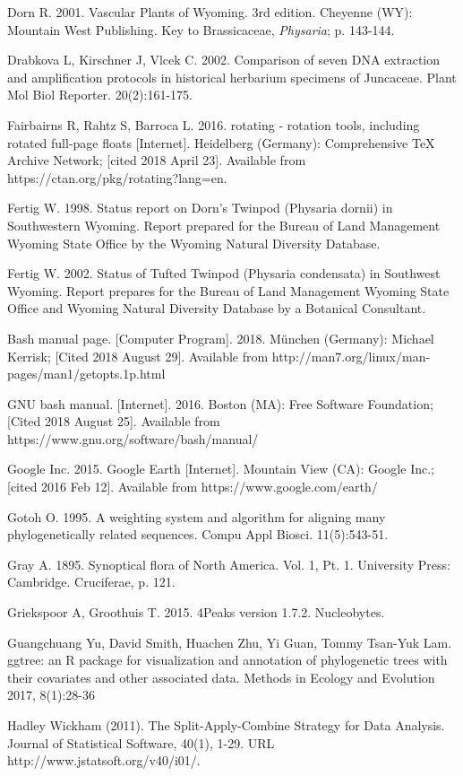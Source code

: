 Dorn R. 2001. Vascular Plants of Wyoming. 3rd edition. Cheyenne (WY): Mountain West Publishing. Key to Brassicaceae, \textit{Physaria}; p. 143-144.

Drabkova L, Kirschner J, Vlcek C. 2002. Comparison of seven DNA extraction and amplification protocols in historical herbarium specimens of Juncaceae. Plant Mol Biol Reporter. 20(2):161-175.

Fairbairns R, Rahtz S, Barroca L. 2016. rotating - rotation tools, including rotated full-page floats [Internet]. Heidelberg (Germany): Comprehensive TeX Archive Network; [cited 2018 April 23]. Available from https://ctan.org/pkg/rotating?lang=en.

Fertig W. 1998. Status report on Dorn’s Twinpod (Physaria dornii) in Southwestern Wyoming. Report prepared for the Bureau of Land Management Wyoming State Office by the Wyoming Natural Diversity Database.  

Fertig W. 2002. Status of Tufted Twinpod (Physaria condensata) in Southwest Wyoming. Report prepares for the Bureau of Land Management Wyoming State Office and Wyoming Natural Diversity Database by a Botanical Consultant.

Bash manual page. [Computer Program]. 2018. München (Germany): Michael Kerrisk; [Cited 2018 August 29].  Available from http://man7.org/linux/man-pages/man1/getopts.1p.html

GNU bash manual. [Internet]. 2016. Boston (MA): Free Software Foundation; [Cited 2018 August 25]. Available from https://www.gnu.org/software/bash/manual/

Google Inc. 2015. Google Earth [Internet]. Mountain View (CA): Google Inc.; [cited 2016 Feb 12]. Available from https://www.google.com/earth/

Gotoh O. 1995. A weighting system and algorithm for aligning many phylogenetically related sequences. Compu Appl Biosci. 11(5):543-51.

Gray A. 1895. Synoptical flora of North America. Vol. 1, Pt. 1. University Press: Cambridge. Cruciferae, p. 121.

Griekspoor A, Groothuis T. 2015. 4Peaks version 1.7.2. Nucleobytes.

Guangchuang Yu, David Smith, Huachen Zhu, Yi Guan, Tommy Tsan-Yuk Lam. ggtree: an R package for visualization and annotation of phylogenetic trees with their covariates and other associated data. Methods in Ecology and Evolution 2017, 8(1):28-36
  
Hadley Wickham (2011). The Split-Apply-Combine Strategy for Data Analysis. Journal of Statistical Software, 40(1), 1-29. URL http://www.jstatsoft.org/v40/i01/.

